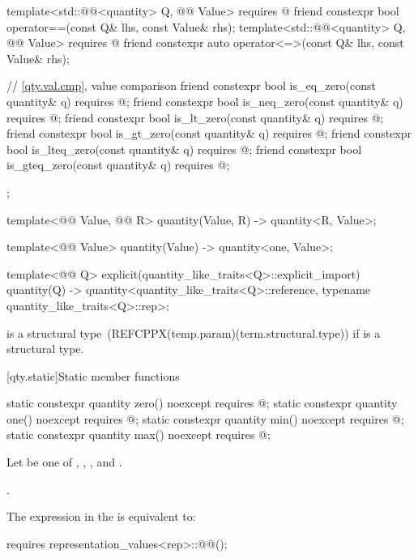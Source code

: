 \begin{codeblock}
{{  template<std::@@<quantity> Q, @@ Value>
    requires @\seebelownc@
  friend constexpr bool operator==(const Q& lhs, const Value& rhs);
  template<std::@@<quantity> Q, @@ Value>
    requires @\seebelownc@
  friend constexpr auto operator<=>(const Q& lhs, const Value& rhs);

  // \ref{qty.val.cmp}, value comparison
  friend constexpr bool is_eq_zero(const quantity& q) requires @\seebelownc@;
  friend constexpr bool is_neq_zero(const quantity& q) requires @\seebelownc@;
  friend constexpr bool is_lt_zero(const quantity& q) requires @\seebelownc@;
  friend constexpr bool is_gt_zero(const quantity& q) requires @\seebelownc@;
  friend constexpr bool is_lteq_zero(const quantity& q) requires @\seebelownc@;
  friend constexpr bool is_gteq_zero(const quantity& q) requires @\seebelownc@;
};

template<@@ Value, @@ R>
quantity(Value, R) -> quantity<R{}, Value>;

template<@@ Value>
quantity(Value) -> quantity<one, Value>;

template<@@ Q>
explicit(quantity_like_traits<Q>::explicit_import) quantity(Q)
  -> quantity<quantity_like_traits<Q>::reference, typename quantity_like_traits<Q>::rep>;

}
\end{codeblock}

\pnum
{} is a structural type~(REFCPPX(temp.param)(term.structural.type))
if  is a structural type.

[qty.static]{Static member functions}

\begin{itemdecl}
static constexpr quantity zero() noexcept
  requires @\seebelownc@;
static constexpr quantity one() noexcept
  requires @\seebelownc@;
static constexpr quantity min() noexcept
  requires @\seebelownc@;
static constexpr quantity max() noexcept
  requires @\seebelownc@;
\end{itemdecl}

\begin{itemdescr}
\pnum
Let  be one of , , , and .

\pnum
\returns
{}.

\pnum
\remarks
The expression in the  is equivalent to:
\begin{codeblock}
requires { representation_values<rep>::@@(); }
\end{codeblock}
\end{itemdescr}

